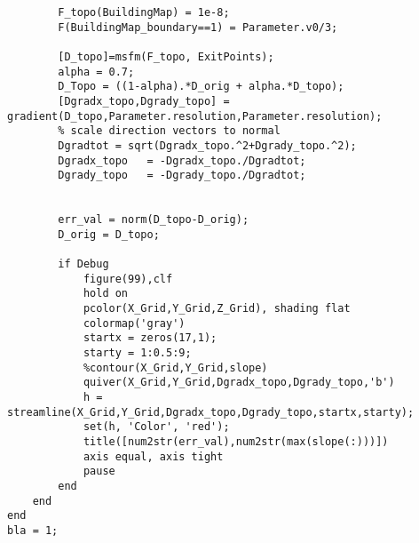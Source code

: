 \begin{lstlisting}[breaklines]
        % add buildings to map
        F_topo(BuildingMap) = 1e-8;
        F(BuildingMap_boundary==1) = Parameter.v0/3;

        [D_topo]=msfm(F_topo, ExitPoints);
        alpha = 0.7;
        D_Topo = ((1-alpha).*D_orig + alpha.*D_topo);
        [Dgradx_topo,Dgrady_topo] = gradient(D_topo,Parameter.resolution,Parameter.resolution);
        % scale direction vectors to normal
        Dgradtot = sqrt(Dgradx_topo.^2+Dgrady_topo.^2);
        Dgradx_topo   = -Dgradx_topo./Dgradtot;
        Dgrady_topo   = -Dgrady_topo./Dgradtot;


        err_val = norm(D_topo-D_orig);
        D_orig = D_topo;

        if Debug
            figure(99),clf
            hold on
            pcolor(X_Grid,Y_Grid,Z_Grid), shading flat
            colormap('gray')
            startx = zeros(17,1);
            starty = 1:0.5:9;
            %contour(X_Grid,Y_Grid,slope)
            quiver(X_Grid,Y_Grid,Dgradx_topo,Dgrady_topo,'b')
            h = streamline(X_Grid,Y_Grid,Dgradx_topo,Dgrady_topo,startx,starty);
            set(h, 'Color', 'red');
            title([num2str(err_val),num2str(max(slope(:)))])
            axis equal, axis tight
            pause
        end
    end
end
bla = 1;
\end{lstlisting}